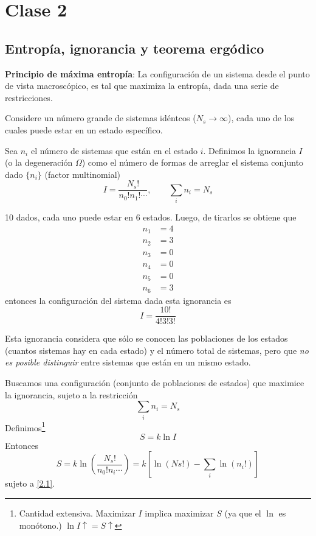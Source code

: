 \section{Clase 2}\label{clase:2}
\subsection{Entropía, ignorancia y teorema ergódico}
\begin{tcolorbox}
	\textbf{Principio de máxima entropía}: La configuración de un sistema desde el punto de vista macroscópico, es tal que maximiza la entropía, dada una serie de restricciones.
\end{tcolorbox}

Considere un número grande de sistemas idéntcos ($N_s\to \infty$), cada uno de los cuales puede estar en un estado específico.

Sea $n_i$ el número de sistemas que están en el estado $i$. Definimos la ignorancia $I$ (o la degeneración $\Omega$) como el número de formas de arreglar el sistema conjunto dado $\{n_i\}$ (factor multinomial)
\begin{equation}
  \boxed{I=\frac{N_s!}{n_0!n_1!\cdots},\qquad \sum_i n_i=N_s}
\end{equation}
\begin{ej}
	10 dados, cada uno puede estar en 6 estados. Luego, de tirarlos se obtiene que
	\begin{align}
  n_1&=4\\
  n_2&=3\\
  n_3&=0\\
  n_4&=0\\
  n_5&=0\\
  n_6&=3
\end{align}
entonces la configuración del sistema dada esta ignorancia es
\begin{equation}
  I=\frac{10!}{4!3!3!}
\end{equation}
\end{ej}
Esta ignorancia considera que sólo se conocen las poblaciones de los estados (cuantos sistemas hay en cada estado) y el número total de sistemas, pero que \textit{no es posible distinguir} entre sistemas que están en un mismo estado.

Buscamos una configuración (conjunto de poblaciones de estados) que maximice la ignorancia, sujeto a la restricción
\begin{equation}\label{2.1}
  \sum _i n_i=N_s
\end{equation}
Definimos\footnote{Cantidad extensiva. Maximizar $I$ implica maximizar $S$ (ya que el $\ln$ es monótono.) $\ln I \uparrow=S\uparrow$}
\begin{equation}
  \boxed{S=k\ln I}
\end{equation}
Entonces \begin{equation}\label{2.S}
  S=k\ln\left(\frac{N_s!}{n_0!n_i\cdots}\right)=k[\ln(Ns!)-\sum_i\ln(n_i!)]
\end{equation}
sujeto a \eqref{2.1}.

